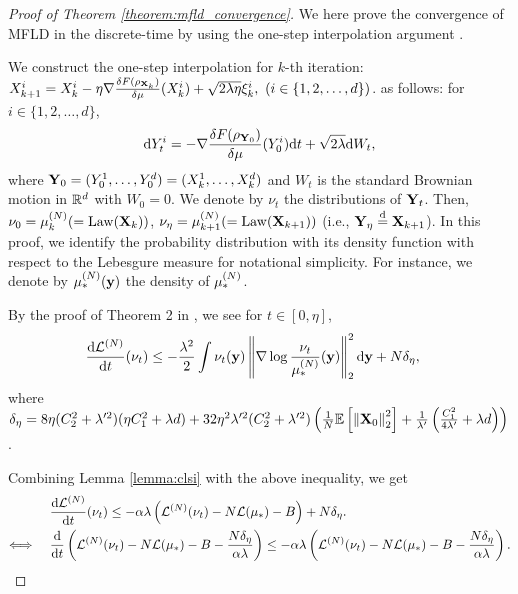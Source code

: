 \begin{proof}[Proof of Theorem \ref{theorem:mfld_convergence}]
    We here prove the convergence of MFLD in the discrete-time by using the one-step interpolation argument \cite{nitanda2024improved,suzuki2023convergence}. 
    
    We construct the one-step interpolation for $k$-th iteration: $X_{k+1}^i = X_k^i - \eta \nabla \frac{\delta F(\rho_{\mathbf{X}_k})}{\delta \mu}(X_k^i) + \sqrt{2\lambda \eta} \xi_k^i,~(i\in \{1,2,\ldots,d\})$.
    as follows: for $i\in \{1,2,\ldots,d\}$,
    \begin{equation}\label{eq:noisy-GD_dynamics}
        \mathrm{d} Y_t^i = - \nabla \frac{\delta F(\rho_{\mathbf{Y}_0})}{\delta \mu}(Y_0^i)\mathrm{d} t + \sqrt{2\lambda}\mathrm{d} W_t,
    \end{equation}
    where $\mathbf{Y}_0 = (Y_0^1,\ldots,Y_0^d) = (X_k^1,\ldots,X_k^d)$ and $W_t$ is the standard Brownian motion in $\mathbb{R}^d$ with $W_0 = 0$.
    We denote by $\nu_t$ the distributions of $\mathbf{Y}_t$. 
    Then, $\nu_0 = \pow[\mu,N]_k (= \mathrm{Law}(\vX_k))$, $\nu_\eta = \pow[\mu,N]_{k+1} (=\mathrm{Law}(\vX_{k+1}))$ (i.e., $\mathbf{Y}_{\eta} \overset{\mathrm{d}}{=} \mathbf{X}_{k+1}$).
    In this proof, we identify the probability distribution with its density function with respect to the Lebesgure measure for notational simplicity. For instance, we denote by $\pow[\mu,N]_*(\vy)$ the density of $\pow[\mu,N]_*$. 

    By the proof of Theorem 2 in \citet{nitanda2024improved}, we see for $t \in [0,\eta]$,
    \begin{align}
        \frac{\rd \pow[\cL,N]}{\rd t}(\nu_t)
        &\leq - \frac{\lambda^2}{2} \int \nu_t(\vy) \left\| \nabla \log \frac{\nu_t}{\pow[\mu,N]_*}(\vy) \right\|_2^2 \rd \vy 
        + N \delta_\eta, \label{eq:one_step_decrease}
    \end{align}
    where $\delta_\eta = 8\eta( C_2^2 + \lambda^{\prime 2}) (\eta C_1^2 + \lambda d) 
    + 32 \eta^2 \lambda'^2( C_2^2 + \lambda^{\prime 2}) \left( \frac{1}{N}\mathbb{E}\left[ \left\| \mathbf{X}_0 \right\|_2^2 \right] + \frac{1}{\lambda'}\left(\frac{C_1^2}{4\lambda'} + \lambda d\right) \right)$.

    Combining Lemma \ref{lemma:clsi} with the above inequality, we get
    \begin{align*}
        &\frac{\rd \pow[\cL,N]}{\rd t}(\nu_t)
        \leq  - \alpha \lambda \left( \pow[\cL,N](\nu_t) - N \cL(\mu_*) - B \right)
        + N \delta_\eta. \\
        \Longleftrightarrow 
        ~~~~&\frac{\rd}{\rd t}\left( \pow[\cL,N](\nu_t) - N \cL(\mu_*) - B - \frac{N\delta_\eta}{\alpha \lambda} \right)
        \leq  - \alpha \lambda \left( \pow[\cL,N](\nu_t) - N \cL(\mu_*) - B - \frac{N\delta_\eta}{\alpha \lambda} \right).
    \end{align*}    


\end{proof}

